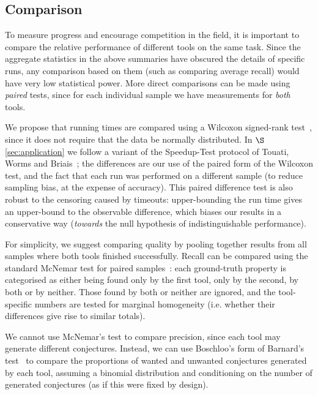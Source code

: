 \subsection{Comparison}

To measure progress and encourage competition in the field, it is important to
compare the relative performance of different tools on the same task. Since the
aggregate statistics in the above summaries have obscured the details of
specific runs, any comparison based on them (such as comparing average recall)
would have very low statistical power. More direct comparisons can be made using
\emph{paired} tests, since for each individual sample we have measurements for
\emph{both} tools.

We propose that running times are compared using a Wilcoxon signed-rank
test~\cite{wilcoxon1945individual}, since it does not require that the data be
normally distributed. In $\S$\ref{sec:application} we follow a variant of the
Speedup-Test protocol of Touati, Worms and Briais~\cite{touati2013speedup}; the
differences are our use of the paired form of the Wilcoxon test, and the fact
that each run was performed on a different sample (to reduce sampling bias, at
the expense of accuracy). This paired difference test is also robust to the
censoring caused by timeouts: upper-bounding the run time gives an upper-bound
to the observable difference, which biases our results in a conservative way
(\emph{towards} the null hypothesis of indistinguishable performance).

For simplicity, we suggest comparing quality by pooling together results from
all samples where both tools finished successfully. Recall can be compared using
the standard McNemar test for paired samples~\cite{mcnemar1947note}: each
ground-truth property is categorised as either being found only by the first
tool, only by the second, by both or by neither. Those found by both or neither
are ignored, and the tool-specific numbers are tested for marginal homogeneity
(i.e. whether their differences give rise to similar totals).

We cannot use McNemar's test to compare precision, since each tool may generate
different conjectures. Instead, we can use Boschloo's form of Barnard's
test~\cite{lydersen2009recommended} to compare the proportions of wanted and
unwanted conjectures generated by each tool, assuming a binomial distribution
and conditioning on the number of generated conjectures (as if this were fixed
by design).

